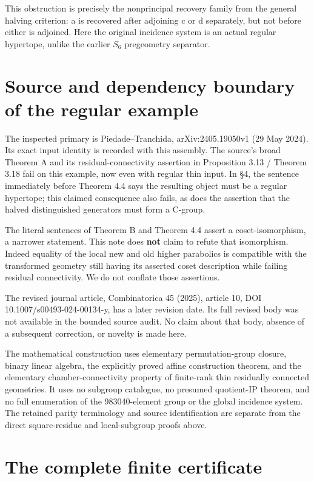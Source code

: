 This obstruction is precisely the nonprincipal recovery family from the
general halving criterion: a is recovered after adjoining c or d
separately, but not before either is adjoined. Here the original
incidence system is an actual regular hypertope, unlike the earlier \(S_6\)
pregeometry separator.

\section{Source and dependency boundary of the regular
example}\label{source-and-dependency-boundary-of-the-regular-example}

The inspected primary is Piedade--Tranchida, arXiv:2405.19050v1 (29 May
2024). Its exact input identity is recorded with this assembly. The
source's broad Theorem A and its residual-connectivity assertion in
Proposition 3.13 / Theorem 3.18 fail on this example, now even with
regular thin input. In §4, the sentence immediately before Theorem 4.4
says the resulting object must be a regular hypertope; this claimed
consequence also fails, as does the assertion that the halved
distinguished generators must form a C-group.

The literal sentences of Theorem B and Theorem 4.4 assert a
coset-isomorphism, a narrower statement. This note does \textbf{not}
claim to refute that isomorphism. Indeed equality of the local new and
old higher parabolics is compatible with the transformed geometry still
having its asserted coset description while failing residual
connectivity. We do not conflate those assertions.

The revised journal article, Combinatorica 45 (2025), article 10, DOI
10.1007/s00493-024-00134-y, has a later revision date. Its full revised
body was not available in the bounded source audit. No claim about that
body, absence of a subsequent correction, or novelty is made here.

The mathematical construction uses elementary permutation-group closure,
binary linear algebra, the explicitly proved affine construction
theorem, and the elementary chamber-connectivity property of finite-rank
thin residually connected geometries. It uses no subgroup catalogue, no
presumed quotient-IP theorem, and no full enumeration of the
983040-element group or the global incidence system. The retained parity
terminology and source identification are separate from the direct
square-residue and local-subgroup proofs above.

\section{The complete finite
certificate}\label{the-complete-finite-certificate}

